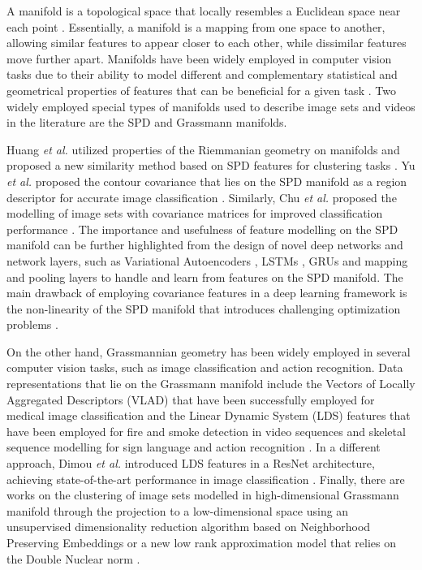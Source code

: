 \documentclass[10pt,twocolumn,letterpaper]{article}
\begin{document}
A manifold is a topological space that locally resembles a Euclidean space near each point \cite{Author41}. Essentially, a manifold is a mapping from one space to another, allowing similar features to appear closer to each other, while dissimilar features move further apart. Manifolds have been widely employed in computer vision tasks due to their ability to model different and complementary statistical and geometrical properties of features that can be beneficial for a given task \cite{Author2,Author51,Author54}. Two widely employed special types of manifolds used to describe image sets and videos in the literature are the SPD and Grassmann manifolds.

Huang \emph{et al.} utilized properties of the Riemmanian geometry on manifolds and proposed a new similarity method based on SPD features for clustering tasks \cite{Author2}. Yu \emph{et al.} proposed the contour covariance that lies on the SPD manifold as a region descriptor for accurate image classification \cite{Author17}. Similarly, Chu \emph{et al.} proposed the modelling of image sets with covariance matrices for improved classification performance \cite{Author20}. The importance and usefulness of feature modelling on the SPD manifold can be further highlighted from the design of novel deep networks and network layers, such as Variational Autoencoders \cite{Author52}, LSTMs \cite{Author53}, GRUs \cite{Author19} and mapping and pooling layers \cite{Author43} to handle and learn from features on the SPD manifold. The main drawback of employing covariance features in a deep learning framework is the non-linearity of the SPD manifold that introduces challenging optimization problems \cite{Author53}.

On the other hand, Grassmannian geometry has been widely employed in several computer vision tasks, such as image classification and action recognition. Data representations that lie on the Grassmann manifold include the Vectors of Locally Aggregated Descriptors (VLAD) that have been successfully employed for medical image classification \cite{Author12} and the Linear Dynamic System (LDS) features that have been employed for fire and smoke detection in video sequences \cite{Author45} and skeletal sequence modelling for sign language and action recognition \cite{Author14,Author18}. In a different approach, Dimou \emph{et al.} introduced LDS features in a ResNet architecture, achieving state-of-the-art performance in image classification \cite{Author46}. Finally, there are works on the clustering of image sets modelled in high-dimensional Grassmann manifold through the projection to a low-dimensional space using an unsupervised dimensionality reduction algorithm based on Neighborhood Preserving Embeddings \cite{Author21} or a new low rank approximation model that relies on the Double Nuclear norm \cite{Author55}.
\end{document}

